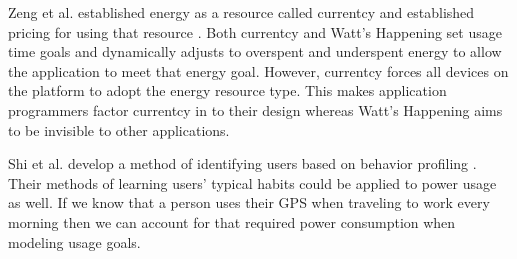 Zeng et al. established energy as a resource called currentcy and established pricing for using that resource \cite{Zeng:2003:CUA:1247340.1247344}. 
Both currentcy and Watt's Happening set usage time goals and dynamically adjusts to overspent and underspent energy to allow the application to meet that energy goal. 
However, currentcy forces all devices on the platform to adopt the energy resource type. 
This makes application programmers factor currentcy in to their design whereas Watt's Happening aims to be invisible to other applications. 

Shi et al. develop a method of identifying users based on behavior profiling \cite{learningUserBehavior}. 
Their methods of learning users' typical habits could be applied to power usage as well. 
If we know that a person uses their GPS when traveling to work every morning then we can account for that required power consumption when modeling usage goals. 
